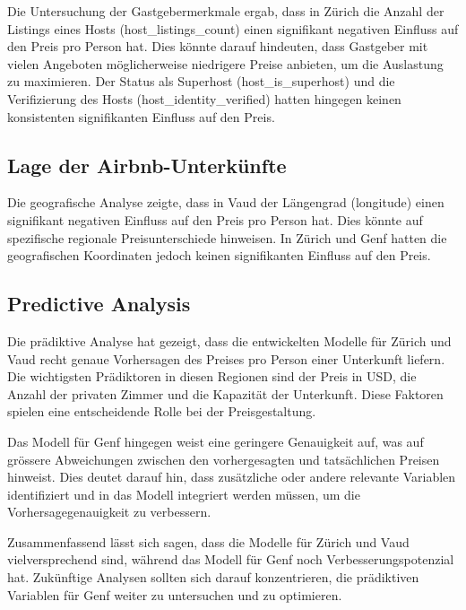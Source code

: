 \documentclass[
  journal,
]{IEEEtran}%
\begin{document}
Die Untersuchung der Gastgebermerkmale ergab, dass in Zürich die Anzahl
der Listings eines Hosts (host\_listings\_count) einen signifikant
negativen Einfluss auf den Preis pro Person hat. Dies könnte darauf
hindeuten, dass Gastgeber mit vielen Angeboten möglicherweise niedrigere
Preise anbieten, um die Auslastung zu maximieren. Der Status als
Superhost (host\_is\_superhost) und die Verifizierung des Hosts
(host\_identity\_verified) hatten hingegen keinen konsistenten
signifikanten Einfluss auf den Preis.

\hypertarget{lage-der-airbnb-unterkuxfcnfte}{%
\subsection{Lage der
Airbnb-Unterkünfte}\label{lage-der-airbnb-unterkuxfcnfte}}

Die geografische Analyse zeigte, dass in Vaud der Längengrad (longitude)
einen signifikant negativen Einfluss auf den Preis pro Person hat. Dies
könnte auf spezifische regionale Preisunterschiede hinweisen. In Zürich
und Genf hatten die geografischen Koordinaten jedoch keinen
signifikanten Einfluss auf den Preis.

\hypertarget{predictive-analysis-2}{%
\subsection{Predictive Analysis}\label{predictive-analysis-2}}

Die prädiktive Analyse hat gezeigt, dass die entwickelten Modelle für
Zürich und Vaud recht genaue Vorhersagen des Preises pro Person einer
Unterkunft liefern. Die wichtigsten Prädiktoren in diesen Regionen sind
der Preis in USD, die Anzahl der privaten Zimmer und die Kapazität der
Unterkunft. Diese Faktoren spielen eine entscheidende Rolle bei der
Preisgestaltung.

Das Modell für Genf hingegen weist eine geringere Genauigkeit auf, was
auf grössere Abweichungen zwischen den vorhergesagten und tatsächlichen
Preisen hinweist. Dies deutet darauf hin, dass zusätzliche oder andere
relevante Variablen identifiziert und in das Modell integriert werden
müssen, um die Vorhersagegenauigkeit zu verbessern.

Zusammenfassend lässt sich sagen, dass die Modelle für Zürich und Vaud
vielversprechend sind, während das Modell für Genf noch
Verbesserungspotenzial hat. Zukünftige Analysen sollten sich darauf
konzentrieren, die prädiktiven Variablen für Genf weiter zu untersuchen
und zu optimieren.
\end{document}
